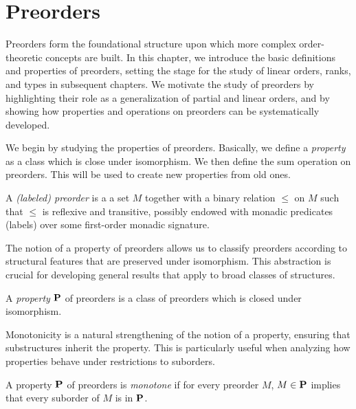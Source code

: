 \section{Preorders}

Preorders form the foundational structure upon which more complex order-theoretic concepts are built. In this chapter, we
introduce the basic definitions and properties of preorders, setting the stage for the study of linear orders, ranks, and types
in subsequent chapters. We motivate the study of preorders by highlighting their role as a generalization of partial and linear
orders, and by showing how properties and operations on preorders can be systematically developed.

We begin by studying the properties of preorders. Basically, we define a \emph{property} as a class which is close under
isomorphism. We then define the sum operation on preorders. This will be used to create new properties from old ones.

\begin{definitions} [Preorder]
  A \emph{(labeled) preorder} is a a set $M$
  together with a binary relation $\le$ on $M$ such that
  $\le$ is reflexive and transitive,
  possibly endowed with monadic predicates (labels)
  over some first-order monadic signature.
\end{definitions}

The notion of a property of preorders allows us to classify preorders according to structural features that are preserved under
isomorphism. This abstraction is crucial for developing general results that apply to broad classes of structures.

\begin{definition}
  A \emph{property} $\mathbf{P}$ of preorders is a class of preorders which
  is closed under isomorphism.
\end{definition}

Monotonicity is a natural strengthening of the notion of a property, ensuring that substructures inherit the property. This is
particularly useful when analyzing how properties behave under restrictions to suborders.

\begin{definition}
  A property $\mathbf{P}$ of preorders is \emph{monotone} if for every preorder $M$,
  $M \in \mathbf{P}$ implies that every suborder of $M$ is in $\mathbf{P}$.
\end{definition}

